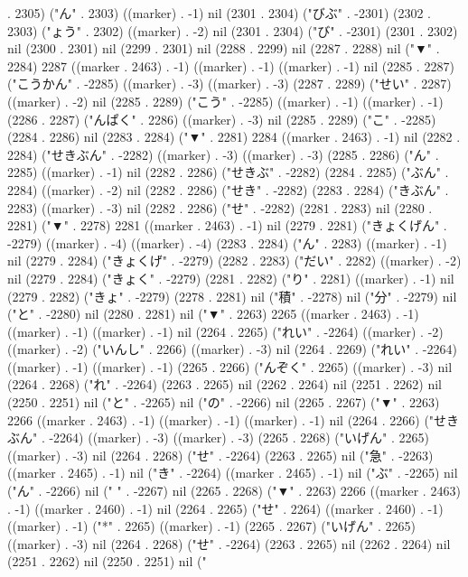 . 2305) ("ん" . 2303) ((marker) . -1) nil (2301 . 2304) ("びぶ" . -2301) (2302 . 2303) ("ょう" . 2302) ((marker) . -2) nil (2301 . 2304) ("び" . -2301) (2301 . 2302) nil (2300 . 2301) nil (2299 . 2301) nil (2288 . 2299) nil (2287 . 2288) nil ("▼" . 2284) 2287 ((marker . 2463) . -1) ((marker) . -1) ((marker) . -1) nil (2285 . 2287) ("こうかん" . -2285) ((marker) . -3) ((marker) . -3) (2287 . 2289) ("せい" . 2287) ((marker) . -2) nil (2285 . 2289) ("こう" . -2285) ((marker) . -1) ((marker) . -1) (2286 . 2287) ("んぱく" . 2286) ((marker) . -3) nil (2285 . 2289) ("こ" . -2285) (2284 . 2286) nil (2283 . 2284) ("▼" . 2281) 2284 ((marker . 2463) . -1) nil (2282 . 2284) ("せきぶん" . -2282) ((marker) . -3) ((marker) . -3) (2285 . 2286) ("ん" . 2285) ((marker) . -1) nil (2282 . 2286) ("せきぶ" . -2282) (2284 . 2285) ("ぶん" . 2284) ((marker) . -2) nil (2282 . 2286) ("せき" . -2282) (2283 . 2284) ("きぶん" . 2283) ((marker) . -3) nil (2282 . 2286) ("せ" . -2282) (2281 . 2283) nil (2280 . 2281) ("▼" . 2278) 2281 ((marker . 2463) . -1) nil (2279 . 2281) ("きょくげん" . -2279) ((marker) . -4) ((marker) . -4) (2283 . 2284) ("ん" . 2283) ((marker) . -1) nil (2279 . 2284) ("きょくげ" . -2279) (2282 . 2283) ("だい" . 2282) ((marker) . -2) nil (2279 . 2284) ("きょく" . -2279) (2281 . 2282) ("り" . 2281) ((marker) . -1) nil (2279 . 2282) ("きょ" . -2279) (2278 . 2281) nil ("積" . -2278) nil ("分" . -2279) nil ("と" . -2280) nil (2280 . 2281) nil ("▼" . 2263) 2265 ((marker . 2463) . -1) ((marker) . -1) ((marker) . -1) nil (2264 . 2265) ("れい" . -2264) ((marker) . -2) ((marker) . -2) ("いんし" . 2266) ((marker) . -3) nil (2264 . 2269) ("れい" . -2264) ((marker) . -1) ((marker) . -1) (2265 . 2266) ("んぞく" . 2265) ((marker) . -3) nil (2264 . 2268) ("れ" . -2264) (2263 . 2265) nil (2262 . 2264) nil (2251 . 2262) nil (2250 . 2251) nil ("と" . -2265) nil ("の" . -2266) nil (2265 . 2267) ("▼" . 2263) 2266 ((marker . 2463) . -1) ((marker) . -1) ((marker) . -1) nil (2264 . 2266) ("せきぶん" . -2264) ((marker) . -3) ((marker) . -3) (2265 . 2268) ("いげん" . 2265) ((marker) . -3) nil (2264 . 2268) ("せ" . -2264) (2263 . 2265) nil ("急" . -2263) ((marker . 2465) . -1) nil ("き" . -2264) ((marker . 2465) . -1) nil ("ぶ" . -2265) nil ("ん" . -2266) nil (" " . -2267) nil (2265 . 2268) ("▼" . 2263) 2266 ((marker . 2463) . -1) ((marker . 2460) . -1) nil (2264 . 2265) ("せ" . 2264) ((marker . 2460) . -1) ((marker) . -1) ("*" . 2265) ((marker) . -1) (2265 . 2267) ("いげん" . 2265) ((marker) . -3) nil (2264 . 2268) ("せ" . -2264) (2263 . 2265) nil (2262 . 2264) nil (2251 . 2262) nil (2250 . 2251) nil ("
